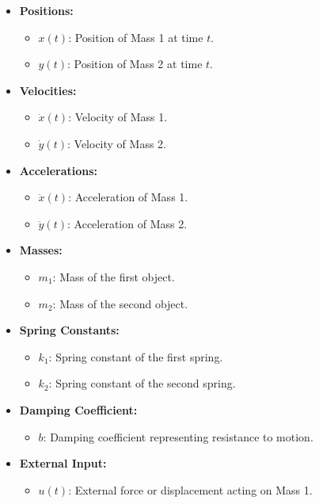 \documentclass[12pt]{article}
\begin{document}
\begin{itemize}
    \item \textbf{Positions:}
    \begin{itemize}
        \item \( x(t) \): Position of Mass 1 at time \( t \).
        \item \( y(t) \): Position of Mass 2 at time \( t \).
    \end{itemize}
    \item \textbf{Velocities:}
    \begin{itemize}
        \item \( \dot{x}(t) \): Velocity of Mass 1.
        \item \( \dot{y}(t) \): Velocity of Mass 2.
    \end{itemize}
    \item \textbf{Accelerations:}
    \begin{itemize}
        \item \( \ddot{x}(t) \): Acceleration of Mass 1.
        \item \( \ddot{y}(t) \): Acceleration of Mass 2.
    \end{itemize}
    \item \textbf{Masses:}
    \begin{itemize}
        \item \( m_1 \): Mass of the first object.
        \item \( m_2 \): Mass of the second object.
    \end{itemize}
    \item \textbf{Spring Constants:}
    \begin{itemize}
        \item \( k_1 \): Spring constant of the first spring.
        \item \( k_2 \): Spring constant of the second spring.
    \end{itemize}
    \item \textbf{Damping Coefficient:}
    \begin{itemize}
        \item \( b \): Damping coefficient representing resistance to motion.
    \end{itemize}
    \item \textbf{External Input:}
    \begin{itemize}
        \item \( u(t) \): External force or displacement acting on Mass 1.
    \end{itemize}
\end{itemize}
\end{document}
